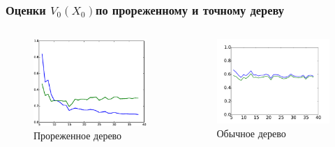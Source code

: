 \documentclass[unicode, notheorems]{beamer}
\begin{document}
\begin{frame}\frametitle{Оценки $V_0(X_0)$по прореженному и точному дереву}
    \begin{columns}
        \begin{column}{0.5\textwidth}
            \begin{figure}
                \centering
                \includegraphics[width=\linewidth]{true_value_test_empiric_distr}
                \caption{Прореженное дерево}
                \label{fig:true_value_test_empiric_distrib}
            \end{figure}
        \end{column}
        \begin{column}{0.5\textwidth}
            \begin{figure}
                \centering
                \includegraphics[width=\linewidth]{true_value_test_standard}
                \caption{Обычное дерево}
                \label{fig:true_value_test_standard}
            \end{figure}
    \end{column}
\end{columns}
\end{frame}
\end{document}
